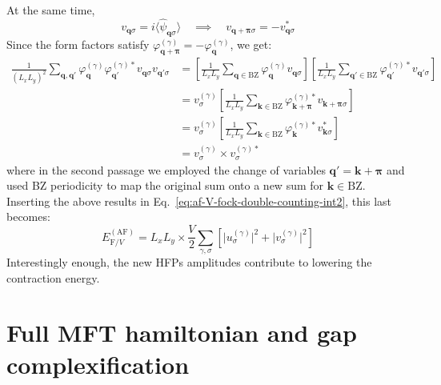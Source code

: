 At the same time,
\[
	v_{\mathbf{q}\sigma} = i\langle
		\hat \psi_{\mathbf{q}\sigma}
	\rangle
	\quad\implies\quad
	v_{\mathbf{q}+\bm{\pi}\sigma} = - v_{\mathbf{q}\sigma}^*
\]
Since the form factors satisfy $\varphi_{\mathbf{q}+\bm{\pi}}^{(\gamma)} = -\varphi_{\mathbf{q}}^{(\gamma)}$, we get:
\[
\begin{aligned}
	\frac{1}{(L_x L_y)^2} \sum_{\mathbf{q}, \mathbf{q}'} \varphi_{\mathbf{q}}^{(\gamma)} \varphi_{\mathbf{q}'}^{(\gamma)*}
	v_{\mathbf{q}\sigma} v_{\mathbf{q}'\sigma} &=
	\left[
		\frac{1}{L_x L_y} \sum_{\mathbf{q}\in\mathrm{BZ}} \varphi_{\mathbf{q}}^{(\gamma)} v_{\mathbf{q}\sigma}
	\right] \left[
		\frac{1}{L_x L_y} \sum_{\mathbf{q}'\in\mathrm{BZ}} \varphi_{\mathbf{q}'}^{(\gamma)*} v_{\mathbf{q}'\sigma}
	\right] \\
	&= v^{(\gamma)}_\sigma \left[
		\frac{1}{L_x L_y} \sum_{\mathbf{k}\in\mathrm{BZ}} \varphi_{\mathbf{k}+\bm{\pi}}^{(\gamma)*} v_{\mathbf{k}+\bm{\pi}\sigma}
	\right] \\
	&= v^{(\gamma)}_\sigma \left[
		\frac{1}{L_x L_y} \sum_{\mathbf{k}\in\mathrm{BZ}} \varphi_{\mathbf{k}}^{(\gamma)*} v_{\mathbf{k}\sigma}^*
	\right] \\
	&= v^{(\gamma)}_\sigma \times v^{(\gamma)*}_\sigma
\end{aligned}
\]
where in the second passage we employed the change of variables $\mathbf{q}'=\mathbf{k}+\bm{\pi}$ and used BZ periodicity to map the original sum onto a new sum for $\mathbf{k}\in\mathrm{BZ}$. Inserting the above results in Eq.~\eqref{eq:af-V-fock-double-counting-int2}, this last becomes:
\begin{equation}\label{eq:af-V-fock-double-counting-int3}
	E_{\mathrm{F}/V}^{(\mathrm{AF})} = L_x L_y \times \frac{V}{2} \sum_{\gamma,\sigma} \left[
		\big|u^{(\gamma)}_\sigma\big|^2 + \big|v^{(\gamma)}_\sigma\big|^2
	\right]
\end{equation}
Interestingly enough, the new HFPs amplitudes contribute to lowering the contraction energy.

\section{Full MFT hamiltonian and gap complexification}\label{sec:af-full-hamiltonian}

